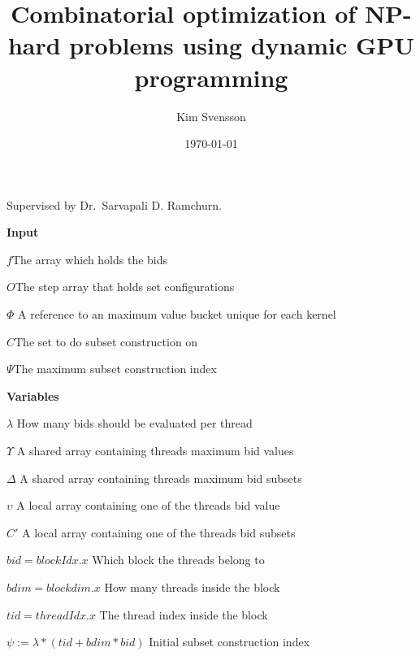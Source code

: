 \documentclass[a4paper, 12pt, notitlepage]{report}
\title{Combinatorial optimization of NP-hard problems using dynamic GPU programming} %
\author{Kim Svensson} %
\date{\today} %
\begin{document}
\maketitle
\begin{center}

Supervised by Dr.\ Sarvapali D. Ramchurn. %
\end{center}
\thispagestyle{empty}

\thispagestyle{empty}
\pagestyle{empty}
\textbf{Input}

$f$\hfill The array which holds the bids

$O$\hfill The step array that holds set configurations

$ \Phi $ \hfill A reference to an maximum value bucket unique for each kernel

$C$\hfill The set to do subset construction on

$\Psi$\hfill The maximum subset construction index


\textbf{Variables} 

$\lambda$ \hfill How many bids should be evaluated per thread

$\Upsilon$ \hfill A shared array containing threads maximum bid values

$\Delta$ \hfill A shared array containing threads maximum bid subsets

$\upsilon$ \hfill A local array containing one of the threads bid value

$C'$ \hfill A local array containing one of the threads bid subsets

$bid = blockIdx.x$ \hfill Which block the threads belong to

$bdim = blockdim.x$ \hfill How many threads inside the block

$tid = threadIdx.x$ \hfill The thread index inside the block

$\psi := \lambda*(tid+bdim*bid)$ \hfill Initial subset construction index
\end{document}
